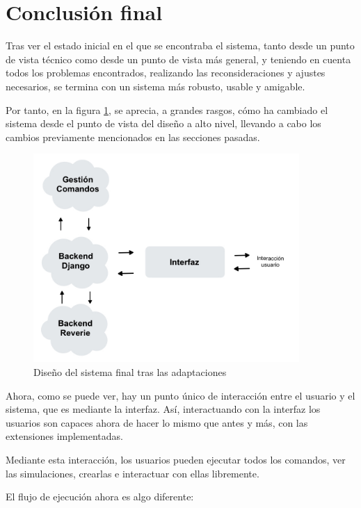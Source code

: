 \section{Conclusión final}

Tras ver el estado inicial en el que se encontraba el sistema, tanto desde un punto de vista técnico como desde un punto de vista más general, y teniendo en cuenta todos los problemas encontrados, realizando las reconsideraciones y ajustes necesarios, se termina con un sistema más robusto, usable y amigable.

Por tanto, en la figura \ref{fig:sistemaFinal}, se aprecia, a grandes rasgos, cómo ha cambiado el sistema desde el punto de vista del diseño a alto nivel, llevando a cabo los cambios previamente mencionados en las secciones pasadas.

\begin{figure}[h]
	\centering
	\includegraphics[width = 0.9\textwidth]{Imagenes/Vectorial/disenoSistemaFinal.jpeg}
	\caption{Diseño del sistema final tras las adaptaciones}
	\label{fig:sistemaFinal}
\end{figure}

Ahora, como se puede ver, hay un punto único de interacción entre el usuario y el sistema, que es mediante la interfaz. Así, interactuando con la interfaz los usuarios son capaces ahora de hacer lo mismo que antes y más, con las extensiones implementadas.

Mediante esta interacción, los usuarios pueden ejecutar todos los comandos, ver las simulaciones, crearlas e interactuar con ellas libremente.

El flujo de ejecución ahora es algo diferente:

